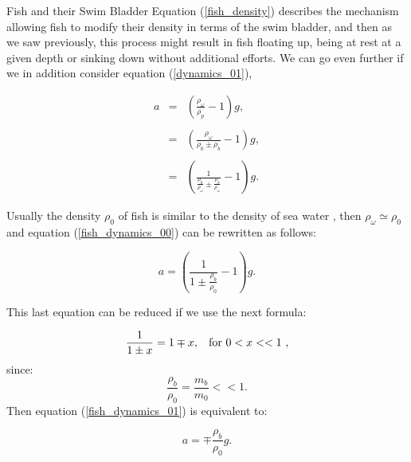 \begin{section}{Fish and their Swim Bladder}
    Equation (\ref{fish_density}) describes the mechanism allowing fish to modify their density in
    terms of the swim bladder, and then as we saw previously, this process might result in fish 
    floating up, being at rest at a given depth or sinking down without additional efforts. We can go 
    even further if we in addition consider equation (\ref{dynamics_01}),
    
    \begin{eqnarray}
        a &=& \left( \frac{\rho_{\omega}}{\rho_p} -1 \right)g,
        \nonumber\\
        {}&{}&{}
        \nonumber \\
        &=& \left( \frac{\rho_{\omega}}{\rho_0 \pm \rho_b} -1 \right)g,
        \nonumber\\
        {}&{}&{}
        \nonumber \\
        \label{fish_dynamics_00}
        &=& \left( \frac{1}{\frac{\rho_0}{\rho_{\omega}} \pm \frac{\rho_b}{\rho_{\omega}}} -1 \right)g.
    \end{eqnarray}
    
    Usually the density $\rho_0$ of fish is similar to the density of sea water \cite{QUENTIN}, then
    $\rho_{\omega} \simeq \rho_0$ and equation (\ref{fish_dynamics_00}) can be rewritten as follows:
    
    \begin{equation}
        \label{fish_dynamics_01}
        a = \left( \frac{1}{ 1 \pm \frac{\rho_b}{\rho_0}} - 1 \right)g.
    \end{equation}
    
    This last equation can be reduced if we use the next formula:
    
    \begin{equation}
        \label{formula}
        \frac{1}{1 \pm x} = 1 \mp x, \hspace{3mm} \text{for  $0<x<<1$ },
    \end{equation}
    since: $$\frac{\rho_b}{\rho_0} = \frac{m_b}{m_0} << 1. $$ Then equation (\ref{fish_dynamics_01})
    is equivalent to:
    
    \begin{equation}
        \label{fish_dynamics_02}
        a = \mp \frac{\rho_b}{\rho_0} g.
    \end{equation}

    
\end{section}
